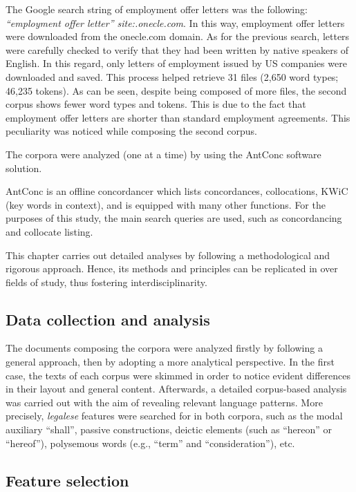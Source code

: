 \documentclass[output=paper]{langscibook}
\begin{document}
The Google search string of employment offer letters was the following: \textit{“employment offer letter” site:.onecle.com}. In this way, employment offer letters were downloaded from the onecle.com domain. As for the previous search, letters were carefully checked to verify that they had been written by native speakers of English. In this regard, only letters of employment issued by US companies were downloaded and saved. This process helped retrieve 31 files (2,650 word types; 46,235 tokens). As can be seen, despite being composed of more files, the second corpus shows fewer word types and tokens. This is due to the fact that employment offer letters are shorter than standard employment agreements. This peculiarity was noticed while composing the second corpus.

The corpora were analyzed (one at a time) by using the AntConc \citep{Anthony2024} software solution.

AntConc is an offline concordancer which lists concordances, collocations, KWiC (key words in context), and is equipped with many other functions. For the purposes of this study, the main search queries are used, such as concordancing and collocate listing.

This chapter carries out detailed analyses by following a methodological and rigorous approach. Hence, its methods and principles can be replicated in over fields of study, thus fostering interdisciplinarity.

\subsection{Data collection and analysis}\label{sec:giampieri:3.1}

The documents composing the corpora were analyzed firstly by following a general approach, then by adopting a more analytical perspective. In the first case, the texts of each corpus were skimmed in order to notice evident differences in their layout and general content. Afterwards, a detailed corpus-based analysis was carried out with the aim of revealing relevant language patterns. More precisely, \textit{legalese} features were searched for in both corpora, such as the modal auxiliary “shall”, passive constructions, deictic elements (such as “hereon” or “hereof”), polysemous words (e.g., “term” and “consideration”), etc.

\subsection{Feature selection}\label{sec:giampieri:3.2}
\end{document}
